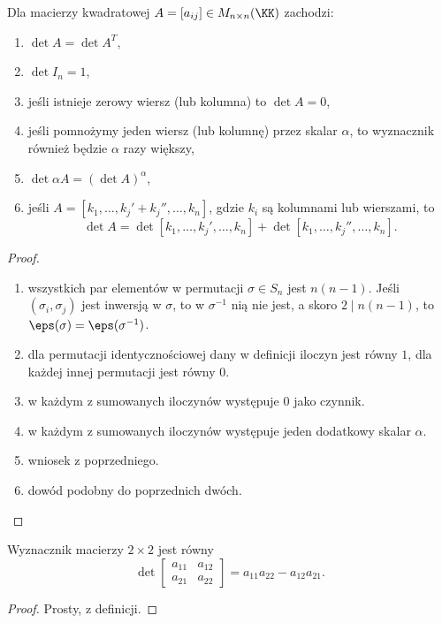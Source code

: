 \begin{theorem}
    Dla macierzy kwadratowej $A = [a_{ij}] \in M_{n\times n}(\KK)$ zachodzi:
    \begin{enumerate}
        \item $\det A = \det A^T$,
        \item $\det I_n = 1$,
        \item jeśli istnieje zerowy wiersz (lub kolumna) to $\det A = 0$,
        \item jeśli pomnożymy jeden wiersz (lub kolumnę) przez skalar $\alpha$, to wyznacznik również będzie $\alpha$ razy większy,
        \item $\det \alpha A = (\det A) ^ \alpha$,
        \item jeśli $A = [k_1, \ldots, k_j' + k_j'', \ldots, k_n]$, gdzie $k_i$ są kolumnami lub wierszami, to
              \[ \det A = \det [k_1, \ldots, k_j', \ldots, k_n] + \det [k_1, \ldots, k_j'', \ldots, k_n]. \]
    \end{enumerate}
\end{theorem}
\begin{proof}
    \begin{enumerate}
        \item wszystkich par elementów w permutacji $\sigma \in S_n$ jest $n(n-1)$. Jeśli $(\sigma_i, \sigma_j)$ jest inwersją w $\sigma$, to w $\sigma^{-1}$ nią nie jest, a skoro $2\mid n(n-1)$, to $\eps(\sigma) = \eps(\sigma^{-1})$.
        \item dla permutacji identycznościowej dany w definicji iloczyn jest równy $1$, dla każdej innej permutacji jest równy $0$.
        \item w każdym z sumowanych iloczynów występuje $0$ jako czynnik.
        \item w każdym z sumowanych iloczynów występuje jeden dodatkowy skalar $\alpha$.
        \item wniosek z poprzedniego.
        \item dowód podobny do poprzednich dwóch.
    \end{enumerate}
\end{proof}

\begin{theorem}
    Wyznacznik macierzy $2 \times 2$ jest równy
    \[ \det\begin{bmatrix}
        a_{11} & a_{12} \\
        a_{21} & a_{22}
    \end{bmatrix} = a_{11}a_{22} - a_{12}a_{21}. \]
\end{theorem}
\begin{proof}
    Prosty, z definicji.
\end{proof}

